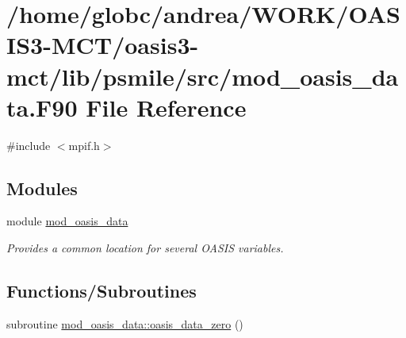 \hypertarget{mod__oasis__data_8_f90}{}\section{/home/globc/andrea/\+W\+O\+R\+K/\+O\+A\+S\+I\+S3-\/\+M\+C\+T/oasis3-\/mct/lib/psmile/src/mod\+\_\+oasis\+\_\+data.F90 File Reference}
\label{mod__oasis__data_8_f90}
{\ttfamily \#include $<$mpif.\+h$>$}\newline
\subsection*{Modules}
\begin{DoxyCompactItemize}
\item 
module \hyperlink{namespacemod__oasis__data}{mod\+\_\+oasis\+\_\+data}
\begin{DoxyCompactList}\small\item\em Provides a common location for several O\+A\+S\+IS variables. \end{DoxyCompactList}\end{DoxyCompactItemize}
\subsection*{Functions/\+Subroutines}
\begin{DoxyCompactItemize}
\item 
subroutine \hyperlink{namespacemod__oasis__data_a7a3b7c8004b8d8869bbfa1fd4723da3e}{mod\+\_\+oasis\+\_\+data\+::oasis\+\_\+data\+\_\+zero} ()
\end{DoxyCompactItemize}
